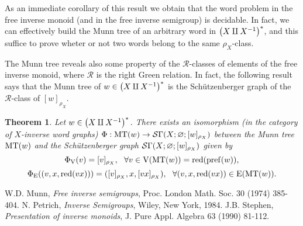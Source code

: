 \documentclass[12pt]{article}
\newtheorem{thm}{Theorem}
\begin{document}
As an immediate corollary of this result we obtain that the word problem in the free inverse monoid (and in the free inverse semigroup) is decidable. In fact, we can effectively build the Munn tree of an arbitrary word in $\left( X\amalg X^{-1} \right)^\ast$, and this suffice to prove wheter or not two words belong to the same $\rho_X$-class.

The Munn tree reveals also some property of the $\mathcal R$-classes of elements of the free inverse monoid, where $\mathcal R$ is the right Green relation. In fact, the following result says that  the Munn tree of $w\in\left( X\amalg X^{-1} \right)^\ast$ is the Sch\"{u}tzenberger graph of the $\mathcal R$-class of $[w]_{\rho_X}$.

\begin{thm}
Let $w\in\left( X\amalg X^{-1} \right)^\ast$. There exists an isomorphism (in the category of $X$-inverse word graphs) $\Phi:\mathrm{MT}(w)\rightarrow \mathcal{S}\Gamma(X;\varnothing;[w]_{\rho_X})$ between the Munn tree $\mathrm{MT}(w)$ and the Sch\"{u}tzenberger graph $\mathcal{S}\Gamma(X;\varnothing;[w]_{\rho_X})$ given by 
$$\Phi_{\mathrm{V}}(v)=[v]_{\rho_X},\ \ \forall v\in\mathrm{V}(\mathrm{MT}(w))=\mathrm{red}(\mathrm{pref}(w)),$$
$$\Phi_\E((v,x,\redu(vx)))=([v]_{\rho_X},x,[vx]_{\rho_X}),\ \ \forall (v,x,\redu(vx))\in\E(\mt(w)).$$
\end{thm}



\begin{thebibliography}{9}
 W.D. Munn, \emph{Free inverse semigroups}, Proc. London Math. Soc. 30 (1974) 385-404.
 N. Petrich, \emph{Inverse Semigroups}, Wiley, New York, 1984.
 J.B. Stephen, \emph{Presentation of inverse monoids}, J. Pure Appl. Algebra 63 (1990) 81-112.
\end{thebibliography}

\end{document}
